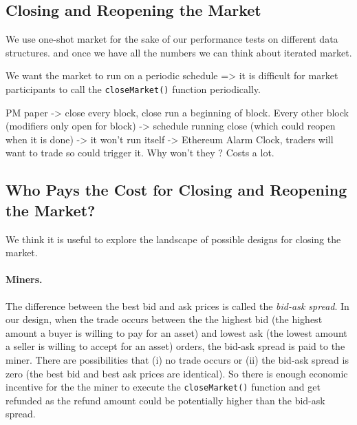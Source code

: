 \subsection{Closing and Reopening the Market}

We use one-shot market for the sake of our performance tests on different data structures. and once we have all the numbers we can think about iterated market.


 We want the market to run on a periodic schedule => it is difficult for market participants to call the \texttt{closeMarket()} function periodically.

 PM paper -> close every block, close run a beginning of block. 
 Every other block (modifiers only open for block) -> schedule running close (which could reopen when it is done) -> it won't run itself -> Ethereum Alarm Clock, traders will want to trade so could trigger it. Why won't they ? Costs a lot. 
 



\subsection{Who Pays the Cost for Closing and Reopening the Market?}

We think it is useful to explore the landscape of possible designs for closing the market. 

\paragraph{Miners.} The difference between the best bid and ask prices is called the \textit{bid-ask spread}. In our design, when the trade occurs between the the highest bid (the highest amount a buyer is willing to pay for an asset) and lowest ask (the lowest amount a seller is willing to accept for an asset) orders, the bid-ask spread is paid to the miner. There are possibilities that (i) no trade occurs or (ii) the bid-ask spread is zero (\ie the best bid and best ask prices are identical). So there is enough economic incentive for the the miner to execute the \texttt{closeMarket()} function and get refunded as the refund amount could be potentially higher than the bid-ask spread. 


